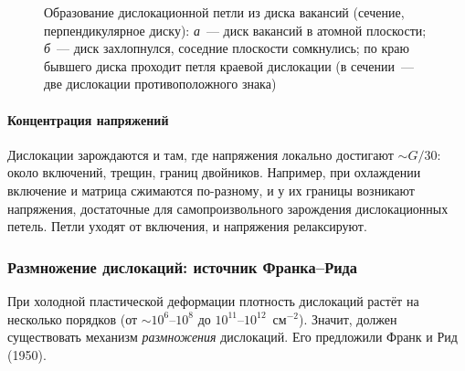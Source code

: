 \begin{figure}[ht]
\centering
\begin{subfigure}[b]{0.46\textwidth}\centering
{}
\caption{}
\end{subfigure}\hfill
\begin{subfigure}[b]{0.46\textwidth}\centering
{}
\caption{}
\end{subfigure}
\caption{Образование дислокационной петли из диска вакансий (сечение,
перпендикулярное диску): \textit{а}~— диск вакансий в атомной плоскости;
\textit{б}~— диск захлопнулся, соседние плоскости сомкнулись; по краю
бывшего диска проходит петля краевой дислокации (в сечении~— две
дислокации противоположного знака)}
\label{fig:vac-disk}
\end{figure}

\paragraph{Концентрация напряжений}
Дислокации зарождаются и там, где напряжения локально достигают
$\sim G/30$: около включений, трещин, границ двойников. Например, при
охлаждении включение и матрица сжимаются по-разному, и у их границы
возникают напряжения, достаточные для самопроизвольного зарождения
дислокационных петель. Петли уходят от включения, и напряжения
релаксируют.

\subsubsection{Размножение дислокаций: источник Франка--Рида}

При холодной пластической деформации плотность дислокаций растёт на
несколько порядков (от $\sim10^{6}$--$10^{8}$ до $10^{11}$--$10^{12}$~см$^{-2}$).
Значит, должен существовать механизм \emph{размножения} дислокаций. Его
предложили Франк и Рид (1950).

